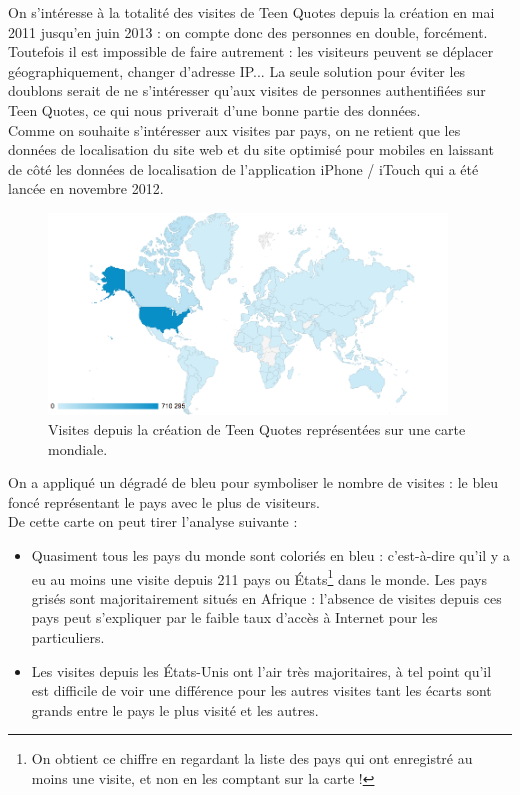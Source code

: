 \documentclass{report}
\begin{document}
	On s'intéresse à la totalité des visites de Teen Quotes depuis la création en mai 2011 jusqu'en juin 2013 : on compte donc des personnes en double, forcément. Toutefois il est impossible de faire autrement : les visiteurs peuvent se déplacer géographiquement, changer d'adresse IP... La seule solution pour éviter les doublons serait de ne s'intéresser qu'aux visites de personnes authentifiées sur Teen Quotes, ce qui nous priverait d'une bonne partie des données.\\

	Comme on souhaite s'intéresser aux visites par pays, on ne retient que les données de localisation du site web et du site optimisé pour mobiles en laissant de côté les données de localisation de l'application iPhone / iTouch qui a été lancée en novembre 2012.
	\begin{figure}[H]
		\center
		\includegraphics[width=400px]{images/visitesMondialesCarte.png}
		\caption{Visites depuis la création de Teen Quotes représentées sur une carte mondiale.}
	\end{figure}
	On a appliqué un dégradé de bleu pour symboliser le nombre de visites : le bleu foncé représentant le pays avec le plus de visiteurs.\\
	De cette carte on peut tirer l'analyse suivante :
	\vspace{10px}
	\begin{itemize}
		\item Quasiment tous les pays du monde sont coloriés en bleu : c'est-à-dire qu'il y a eu au moins une visite depuis 211 pays ou États\footnote{On obtient ce chiffre en regardant la liste des pays qui ont enregistré au moins une visite, et non en les comptant sur la carte !} dans le monde. Les pays grisés sont majoritairement situés en Afrique : l'absence de visites depuis ces pays peut s'expliquer par le faible taux d'accès à Internet pour les particuliers.
		\item Les visites depuis les États-Unis ont l'air très majoritaires, à tel point qu'il est difficile de voir une différence pour les autres visites tant les écarts sont grands entre le pays le plus visité et les autres.
	\end{itemize}
\end{document}
